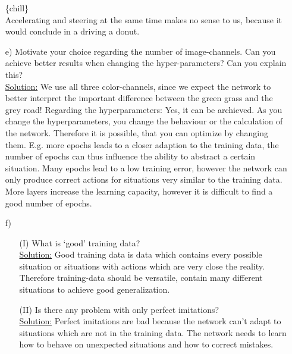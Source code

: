 \documentclass[DIN, pagenumber=false, fontsize=11pt, parskip=half]{scrartcl}
\newcommand{\sol}{\underline{Solution:} }
\begin{document}
\begin{enumerate}[b)]
		\{chill\}\\
		Accelerating and steering at the same time makes no sense to us, because it would conclude in a driving a donut. 
	\item[e)] Motivate your choice regarding the number of image-channels. Can you achieve better results when
	changing the hyper-parameters? Can you explain this?\\\sol
        We use all three color-channels, since we expect the network to better interpret the important difference
        between the green grass and the grey road! Regarding the hyperparameters:
	Yes, it can be archieved. As you change the hyperparameters, you change the behaviour or the calculation of the network.
        Therefore it is possible, that you can optimize by changing them. E.g. more epochs leads to a closer adaption to
        the training data, the number of epochs can thus influence the ability to abstract a certain situation. Many
        epochs lead to a low training error, however the network can only produce correct actions for situations very
        similar to the training data. More layers increase the learning capacity, however it is difficult to find a
       good number of epochs.\\
	\item[f)] \begin{enumerate}
		\item[(I)] What is ‘good’ training data? \\\sol
		Good training data is data which contains every possible situation or situations with actions which are very close the reality.
                Therefore training-data should be versatile, contain many different situations to achieve good
                generalization.
		\item[(II)] Is there any problem with only perfect imitations?\\\sol
		Perfect imitations are bad because the network can't adapt to situations which are not in the training data.
                The network needs to learn how to behave on unexpected situations and how to correct mistakes.
	\end{enumerate}
\end{enumerate}
\end{document}
